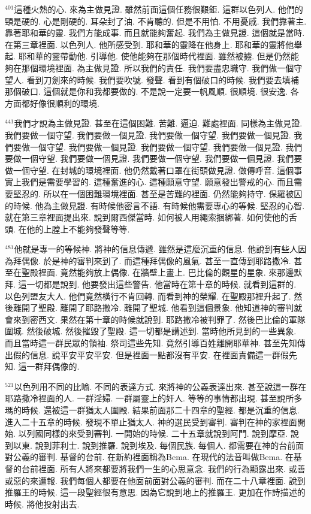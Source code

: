 \documentclass{book}
\begin{document}
$^{401}$這種火熱的心.
來為主做見證.
雖然前面這個任務很艱鉅.
這群以色列人.
他們的頸是硬的.
心是剛硬的.
耳朵封了油.
不肯聽的.
但是不用怕.
不用憂戚.
我們靠著主.
靠著耶和華的靈.
我們方能成事.
而且就能夠奮起.
我們為主做見證.
這個就是當時.
在第三章裡面.
以色列人.
他所感受到.
耶和華的靈降在他身上.
耶和華的靈將他舉起.
耶和華的靈帶動他.
引導他.
使他能夠在那個時代裡面.
雖然被擄.
但是仍然能夠在那個環境裡面.
為主做見證.
所以我們的責任.
我們要盡忠職守.
我們做一個守望人.
看到刀劍來的時候.
我們要吹號.
發聲.
看到有個破口的時候.
我們要去填補那個破口.
這個就是你和我都要做的.
不是說一定要一帆風順.
很順境.
很安逸.
各方面都好像很順利的環境.

$^{441}$我們才說為主做見證.
甚至在這個困難.
苦難.
逼迫.
難處裡面.
同樣為主做見證.
我們要做一個守望.
我們要做一個見證.
我們要做一個守望.
我們要做一個見證.
我們要做一個守望.
我們要做一個見證.
我們要做一個守望.
我們要做一個見證.
我們要做一個守望.
我們要做一個見證.
我們要做一個守望.
我們要做一個見證.
我們要做一個守望.
在封城的環境裡面.
他仍然戴著口罩在街頭做見證.
做傳呼音.
這個事實上我們是需要學習的.
這種奮進的心.
這種願意守望.
願意發出警戒的心.
而且需要堅忍的.
所以在一個困難環境裡面.
甚至是苦難的裡面.
仍然能夠持守.
保羅被囚的時候.
他為主做見證.
有時候他密言不語.
有時候他需要專心的等候.
堅忍的心智.
就在第三章裡面提出來.
說到爾西傑當時.
如何被人用繩索捆綁著.
如何使他的舌頭.
在他的上膛上不能夠發聲等等.

$^{481}$他就是專一的等候神.
將神的信息傳遞.
雖然是這麼沉重的信息.
他說到有些人因為拜偶像.
於是神的審判來到了.
而這種拜偶像的風氣.
甚至一直傳到耶路撒冷.
甚至在聖殿裡面.
竟然能夠放上偶像.
在牆壁上畫上.
巴比倫的觀星的星象.
來那邊默拜.
這一切都是說到.
他要發出這些警告.
他當時在第十章的時候.
就看到這群的.
以色列盟友大人.
他們竟然橫行不肯回轉.
而看到神的榮耀.
在聖殿那裡升起了.
然後離開了聖殿.
離開了耶路撒冷.
離開了聖城.
他看到這個景象.
他知道神的審判就會來到密西文.
果然在第十章的時候就說到.
耶路撒冷被判罪了.
然後巴比倫的軍隊圍城.
然後破城.
然後摧毀了聖殿.
這一切都是講述到.
當時他所見到的一些異象.
而且當時這一群民眾的領袖.
祭司這些先知.
竟然引導百姓離開耶華神.
甚至先知傳出假的信息.
說平安平安平安.
但是裡面一點都沒有平安.
在裡面責備這一群假先知.
這一群拜偶像的.

$^{521}$以色列用不同的比喻.
不同的表達方式.
來將神的公義表達出來.
甚至說這一群在耶路撒冷裡面的人.
一群淫婦.
一群屬靈上的奸人.
等等的事情都出現.
甚至說所多瑪的時候.
還被這一群猶太人圍毆.
結果前面那二十四章的聖經.
都是沉重的信息.
進入二十五章的時候.
發現不單止猶太人.
神的選民受到審判.
審判在神的家裡面開始.
以列國同樣的來受到審判.
一開始的時候.
二十五章就說到阿門.
說到摩亞.
說到以東.
說到菲利士.
說到推羅.
說到埃及.
每個民族.
每個人.
都需要在神的台前面對公義的審判.
基督的台前.
在新約裡面稱為Bema.
在現代的法音叫做Bema.
在基督的台前裡面.
所有人將來都要將我們一生的心思意念.
我們的行為顯露出來.
或善或惡的來遭報.
我們每個人都要在他面前面對公義的審判.
而在二十八章裡面.
說到推羅王的時候.
這一段聖經很有意思.
因為它說到地上的推羅王.
更加在作詩描述的時候.
將他投射出去.
\end{document}
